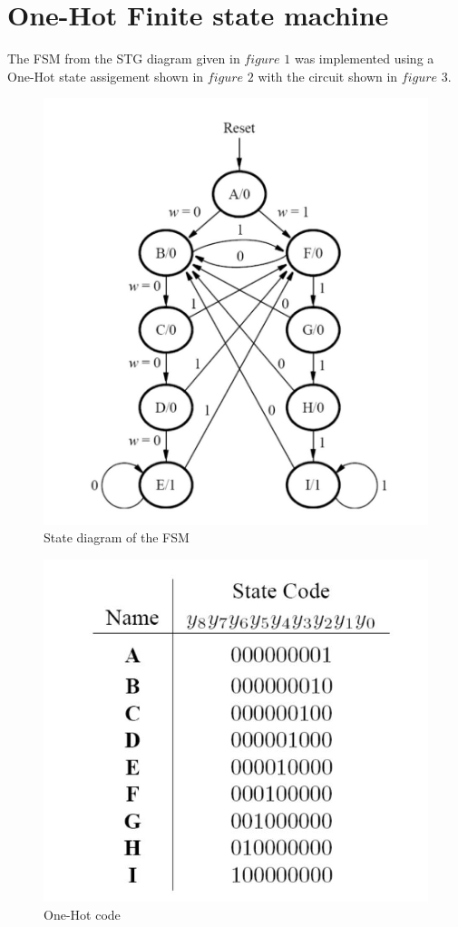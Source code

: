 \documentclass[12pt]{article}
\begin{document}
\newpage

\section{One-Hot Finite state machine}
The FSM from the STG diagram given in $figure$ $1$ was implemented using a One-Hot state assigement shown in $figure$ $2$ with the circuit shown in $figure$ $3$. 
\begin{figure}[h]
	\centering
	\includegraphics[scale = 0.47]{immagini/Berchialla/STG.jpg}
	\caption{State diagram of the FSM}
\end{figure}
\begin{figure}[h]
	\centering
	\includegraphics[scale = 0.7]{immagini/Berchialla/Code1.jpg}
	\caption{One-Hot code}
\end{figure}
\end{document}
